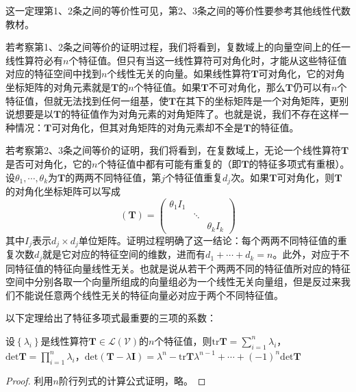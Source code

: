 \documentclass[main.tex]{subfiles}
\begin{document}
这一定理第1、2条之间的等价性可见\cite[\S 5.2 定理2.1]{周胜林2012线性代数}，第2、3条之间的等价性要参考其他线性代数教材\cite[\S 6.2]{Hoffman1971}。

若考察第1、2条之间等价的证明过程，我们将看到，复数域上的向量空间上的任一线性算符必有$n$个特征值。但只有当这一线性算符可对角化时，才能从这些特征值对应的特征空间中找到$n$个线性无关的向量。如果线性算符$\mathbf{T}$可对角化，它的对角坐标矩阵的对角元素就是$\mathbf{T}$的$n$个特征值。如果$\mathbf{T}$不可对角化，那么$\mathbf{T}$仍可以有$n$个特征值，但就无法找到任何一组基，使$\mathbf{T}$在其下的坐标矩阵是一个对角矩阵，更别说想要是以$\mathbf{T}$的特征值作为对角元素的对角矩阵了。也就是说，我们不存在这样一种情况：$\mathbf{T}$可对角化，但其对角矩阵的对角元素却不全是$\mathbf{T}$的特征值。

若考察第2、3条之间等价的证明，我们将看到，在复数域上，无论一个线性算符$\mathbf{T}$是否可对角化，它的$n$个特征值中都有可能有重复的（即$\mathbf{T}$的特征多项式有重根）。设$\theta_1,\cdots,\theta_k$为$\mathbf{T}$的两两不同特征值，第$j$个特征值重复$d_j$次。如果$\mathbf{T}$可对角化，则$\mathbf{T}$的对角化坐标矩阵可以写成
\[\left(\mathbf{T}\right)=\left(\begin{array}{ccc}\theta_1I_1&&\\&\ddots&\\&&\theta_kI_k\end{array}\right)\]
其中$I_j$表示$d_j\times d_j$单位矩阵。证明过程明确了这一结论：每个两两不同特征值的重复次数$d_j$就是它对应的特征空间的维数，进而有$d_1+\cdots+d_k=n$。此外，对应于不同特征值的特征向量线性无关。也就是说从若干个两两不同的特征值所对应的特征空间中分别各取一个向量所组成的向量组必为一个线性无关向量组\cite[\S 5.1 性质1.4]{周胜林2012线性代数}，但是反过来我们不能说任意两个线性无关的特征向量必对应于两个不同特征值。

以下定理\cite[\S 5.1 性质1.1、1.2]{周胜林2012线性代数}给出了特征多项式最重要的三项的系数：

\begin{theorem}\label{thm:II.2.29}
    设$\left\{\lambda_i\right\}$是线性算符$\mathbf{T}\in\mathcal{L}\left(\mathcal{V}\right)$的$n$个特征值，则$\mathrm{tr}\mathbf{T}=\sum_{i=1}^n\lambda_i$，$\mathrm{det}\mathbf{T}=\prod_{i=1}^n\lambda_i$，$\mathrm{det}\left(\mathbf{T}-\lambda\mathbf{I}\right)=\lambda^n-\mathrm{tr}\mathbf{T}\lambda^{n-1}+\cdots+\left(-1\right)^n\mathrm{det}\mathbf{T}$
\end{theorem}
\begin{proof}
    利用$n$阶行列式的计算公式证明，略。
\end{proof}
\end{document}
